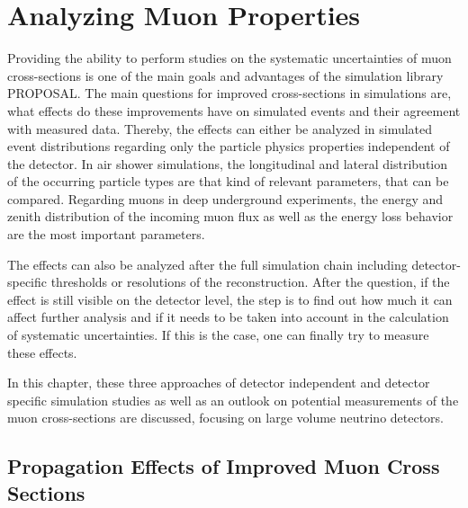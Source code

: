 \chapter{Analyzing Muon Properties} \label{sec:analysis}

Providing the ability to perform studies on the systematic uncertainties of muon cross-sections is one of the main goals and advantages of the simulation library PROPOSAL.
The main questions for improved cross-sections in simulations are, what effects do these improvements have on simulated events and their agreement with measured data.
Thereby, the effects can either be analyzed in simulated event distributions regarding only the particle physics properties independent of the detector.
In air shower simulations, the longitudinal and lateral distribution of the occurring particle types are that kind of relevant parameters, that can be compared.
Regarding muons in deep underground experiments, the energy and zenith distribution of the incoming muon flux as well as the energy loss behavior are the most important parameters.%

The effects can also be analyzed after the full simulation chain including detector-specific thresholds or resolutions of the reconstruction.
After the question, if the effect is still visible on the detector level, the step is to find out how much it can affect further analysis and if it needs to be taken into account in the calculation of systematic uncertainties.
If this is the case, one can finally try to measure these effects.

In this chapter, these three approaches of detector independent and detector specific simulation studies as well as an outlook on potential measurements of the muon cross-sections are discussed, focusing on large volume neutrino detectors.

%

\section{Propagation Effects of Improved Muon Cross Sections}

